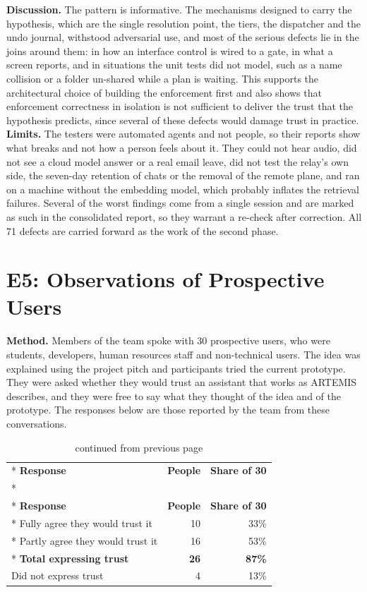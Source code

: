 \documentclass{FastFyp}
\begin{document}
\textbf{Discussion.} The pattern is informative. The mechanisms designed to carry the hypothesis, which are the single resolution point, the tiers, the dispatcher and the undo journal, withstood adversarial use, and most of the serious defects lie in the joins around them: in how an interface control is wired to a gate, in what a screen reports, and in situations the unit tests did not model, such as a name collision or a folder un-shared while a plan is waiting. This supports the architectural choice of building the enforcement first and also shows that enforcement correctness in isolation is not sufficient to deliver the trust that the hypothesis predicts, since several of these defects would damage trust in practice. \textbf{Limits.} The testers were automated agents and not people, so their reports show what breaks and not how a person feels about it. They could not hear audio, did not see a cloud model answer or a real email leave, did not test the relay's own side, the seven-day retention of chats or the removal of the remote plane, and ran on a machine without the embedding model, which probably inflates the retrieval failures. Several of the worst findings come from a single session and are marked as such in the consolidated report, so they warrant a re-check after correction. All 71 defects are carried forward as the work of the second phase.

\section{E5: Observations of Prospective Users}
\textbf{Method.} Members of the team spoke with 30 prospective users, who were students, developers, human resources staff and non-technical users. The idea was explained using the project pitch and participants tried the current prototype. They were asked whether they would trust an assistant that works as ARTEMIS describes, and they were free to say what they thought of the idea and of the prototype. The responses below are those reported by the team from these conversations.

{
\begin{longtable}{|p{6.4cm}|r|r|}
\caption{Stated trust, 30 prospective users.}\label{tab:obs}\\*
\hline
\textbf{Response} & \textbf{People} & \textbf{Share of 30} \\*
\hline
\endfirsthead
\caption[]{continued from previous page}\\*
\hline
\textbf{Response} & \textbf{People} & \textbf{Share of 30} \\*
\hline
\endhead
\hline
Fully agree they would trust it & 10 & 33\% \\*
\hline
Partly agree they would trust it & 16 & 53\% \\*
\hline
\textbf{Total expressing trust} & \textbf{26} & \textbf{87\%} \\
\hline
Did not express trust & 4 & 13\% \\
\hline
\end{longtable}
}
\end{document}

